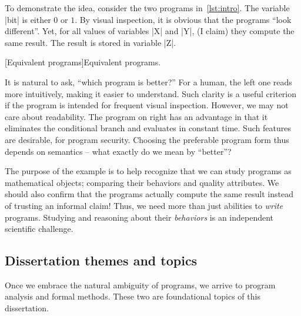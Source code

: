 To demonstrate the idea, consider the two programs in~\autoref{lst:intro}.
The variable \pr|bit| is either \(0\) or \(1\).
By visual inspection, it is obvious that the programs \enquote{look different}.
Yet, for all values of variables \pr|X| and \pr|Y|, (I claim) they compute the same result.
The result is stored in variable \pr|Z|.

\begin{center}
\captionsetup{type=lstlisting}
\begin{minipage}{.3\textwidth}

\end{minipage}%
\hspace{3em}%
\begin{minipage}{.4\textwidth}
\captionsetup{type=lstlisting}

\end{minipage}
[Equivalent programs]{Equivalent programs.}
\label{lst:intro}
\end{center}

It is natural to ask, {\enquote{which program is better?}}
For a human, the left one reads more intuitively, making it easier to understand.
Such clarity is a useful criterion if the program is intended for frequent visual inspection.
However, we may not care about readability.
The program on right has an advantage in that it eliminates the conditional branch and evaluates in {constant time}.
Such features are desirable, \eg for program security.
Choosing the preferable program form thus depends on semantics -- what exactly do we mean by \enquote{better}?

The purpose of the example is to help recognize that we can study programs as mathematical objects;
comparing their behaviors and quality attributes.
We should also confirm that the programs {actually} compute the same result instead of trusting an informal claim!
Thus, we need more than just abilities to \emph{write} programs.
Studying and reasoning about their \emph{behaviors} is an independent scientific challenge.

\subsection{Dissertation themes and topics}
\label{subsec:dissertation-themes}

Once we embrace the natural ambiguity of programs, we arrive to program analysis and formal methods.
These two are foundational topics of this dissertation.

